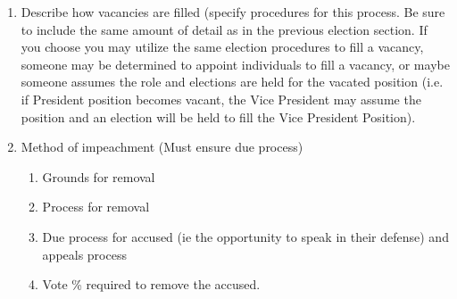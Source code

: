 \documentclass[11pt,a4paper,notitlepage]{article}
\begin{document}
\begin{enumerate}[label=\Alph*.]
\begin{enumerate}[label=\arabic*.]
    \end{enumerate}
  \item Describe how vacancies are filled (specify procedures for this process.  Be sure to include the same amount of detail as in the previous election section.  If you choose you may utilize the same election procedures to fill a vacancy, someone may be determined to appoint individuals to fill a vacancy, or maybe someone assumes the role and elections are held for the vacated position (i.e. if President position becomes vacant, the Vice President may assume the position and an election will be held to fill the Vice President Position).
  \item Method of impeachment (Must ensure due process)
    \begin{enumerate}[label=\arabic*.]
      \item Grounds for removal
      \item Process for removal
      \item Due process for accused (ie the opportunity to speak in their defense) and appeals process
      \item Vote \% required to remove the accused.
    \end{enumerate}
  \end{enumerate}
\end{document}
